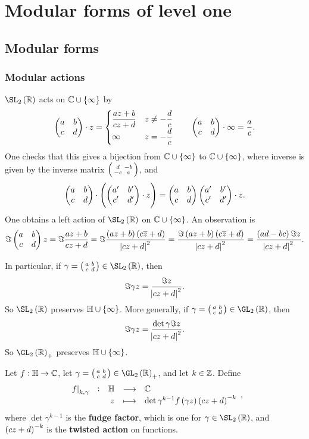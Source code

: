 \pagebreak

\section{Modular forms of level one}

\subsection{Modular forms}

\subsubsection{Modular actions}

$ \SL_2\br{\RR} $ acts on $ \CC \cup \cbr{\infty} $ by
$$ \begin{pmatrix} a & b \\ c & d \end{pmatrix} \cdot z =
\begin{cases}
\dfrac{az + b}{cz + d} & z \ne -\dfrac{d}{c} \\
\infty & z = -\dfrac{d}{c}
\end{cases}
\qquad \begin{pmatrix} a & b \\ c & d \end{pmatrix} \cdot \infty = \dfrac{a}{c}.
$$
One checks that this gives a bijection from $ \CC \cup \cbr{\infty} $ to $ \CC \cup \cbr{\infty} $, where inverse is given by the inverse matrix $ \begin{psmallmatrix} d & -b \\ -c & a \end{psmallmatrix} $, and
$$ \twobytwo{a}{b}{c}{d} \cdot \br{\twobytwo{a'}{b'}{c'}{d'} \cdot z} = \twobytwo{a}{b}{c}{d}\twobytwo{a'}{b'}{c'}{d'} \cdot z. $$
One obtains a left action of $ \SL_2\br{\RR} $ on $ \CC \cup \cbr{\infty} $. An observation is
$$ \Im \twobytwo{a}{b}{c}{d}z = \Im \dfrac{az + b}{cz + d} = \Im \dfrac{\br{az + b}\br{c\overline{z} + d}}{\abs{cz + d}^2} = \dfrac{\Im \br{az + b}\br{c\overline{z} + d}}{\abs{cz + d}^2} = \dfrac{\br{ad - bc}\Im z}{\abs{cz + d}^2}. $$


In particular, if $ \gamma = \twobytwosmall{a}{b}{c}{d} \in \SL_2\br{\RR} $, then
$$ \Im \gamma z = \dfrac{\Im z}{\abs{cz + d}^2}. $$
So $ \SL_2\br{\RR} $ preserves $ \HH \cup \cbr{\infty} $. More generally, if $ \gamma = \twobytwosmall{a}{b}{c}{d} \in \GL_2\br{\RR} $, then
$$ \Im \gamma z = \dfrac{\det \gamma\Im z}{\abs{cz + d}^2}. $$
So $ \GL_2\br{\RR}_+ $ preserves $ \HH \cup \cbr{\infty} $.

\begin{definition}
Let $ f : \mathbb{H} \to \mathbb{C} $, let $ \gamma = \twobytwosmall{a}{b}{c}{d} \in \GL_2\br{\RR}_+ $, and let $ k \in \mathbb{Z} $. Define
$$ \function[\eval{f}_{k, \gamma}]{\HH}{\CC}{z}{\det \gamma^{k - 1}f\br{\gamma z}\br{cz + d}^{-k}}, $$
where $ \det \gamma^{k - 1} $ is the \textbf{fudge factor}, which is one for $ \gamma \in \SL_2\br{\RR} $, and $ \br{cz + d}^{-k} $ is the \textbf{twisted action} on functions.
\end{definition}

